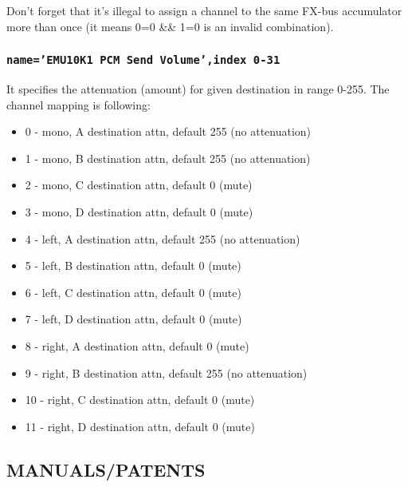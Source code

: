 \documentclass[a4paper,8pt,english]{sphinxmanual}
\begin{document}
Don't forget that it's illegal to assign a channel to the same FX-bus accumulator
more than once (it means 0=0 \&\& 1=0 is an invalid combination).


\subsubsection{\texttt{name='EMU10K1 PCM Send Volume',index 0-31}}
\label{sound/cards/sb-live-mixer:name-emu10k1-pcm-send-volume-index-0-31}
It specifies the attenuation (amount) for given destination in range 0-255.
The channel mapping is following:
\begin{itemize}
\item {} 
0 -  mono, A destination attn, default 255 (no attenuation)

\item {} 
1 -  mono, B destination attn, default 255 (no attenuation)

\item {} 
2 -  mono, C destination attn, default 0 (mute)

\item {} 
3 -  mono, D destination attn, default 0 (mute)

\item {} 
4 -  left, A destination attn, default 255 (no attenuation)

\item {} 
5 -  left, B destination attn, default 0 (mute)

\item {} 
6 -  left, C destination attn, default 0 (mute)

\item {} 
7 -  left, D destination attn, default 0 (mute)

\item {} 
8 - right, A destination attn, default 0 (mute)

\item {} 
9 - right, B destination attn, default 255 (no attenuation)

\item {} 
10 - right, C destination attn, default 0 (mute)

\item {} 
11 - right, D destination attn, default 0 (mute)

\end{itemize}


\subsection{MANUALS/PATENTS}
\label{sound/cards/sb-live-mixer:manuals-patents}
\end{document}
